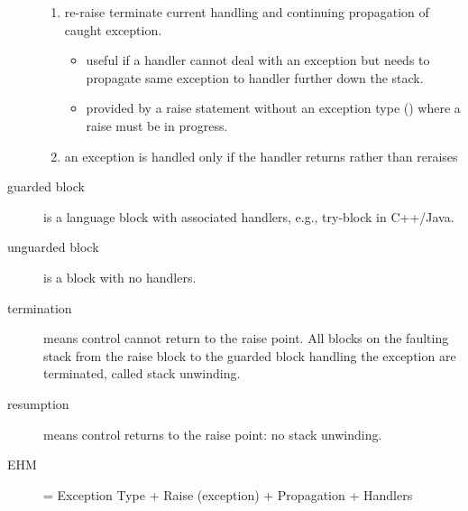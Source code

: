 \documentclass[12pt]{article}
\begin{document}
\begin{description}
\begin{enumerate}
\item re-raise terminate current handling and continuing propagation of caught exception.
\begin{itemize}
\item useful if a handler cannot deal with an exception but needs to propagate same exception to handler further down the stack.
\item provided by a raise statement without an exception type () where a raise must be in progress.
\end{itemize}
\item an exception is handled only if the handler returns rather than reraises
\end{enumerate}
\item[guarded block] is a language block with associated handlers, e.g., try-block in C++/Java.
\item[unguarded block] is a block with no handlers.
\item[termination] means control cannot return to the raise point. All blocks on the faulting stack from the raise block to the guarded block handling the exception are terminated, called stack unwinding.
\item[resumption] means control returns to the raise point: no stack unwinding.
\item[EHM] = Exception Type + Raise (exception) + Propagation + Handlers
\end{description}
\end{document}
